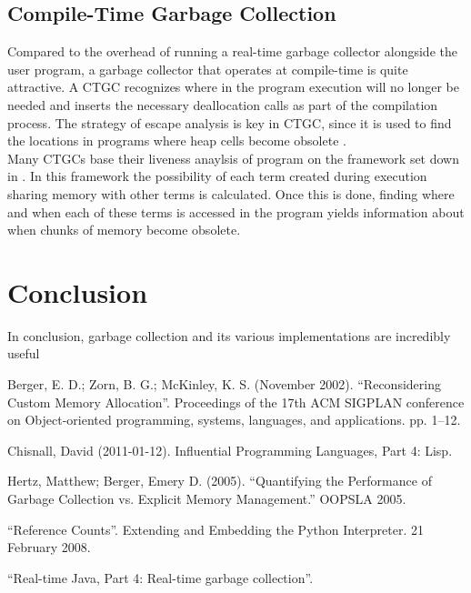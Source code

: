 \documentclass[12pt]{article}
\begin{document}
\subsection{Compile-Time Garbage Collection}
Compared to the overhead of running a real-time garbage collector alongside the user program, a garbage collector that operates at compile-time is quite attractive. A CTGC recognizes where in the program execution will no longer be needed and inserts the necessary deallocation calls as part of the compilation process. The strategy of escape analysis is key in CTGC, since it is used to find the locations in programs where heap cells become obsolete \cite{mercury}. \\

Many CTGCs base their liveness anaylsis of program on the framework set down in \cite{bruynooghe}. In this framework the possibility of each term created during execution sharing memory with other terms is calculated. Once this is done, finding where and when each of these terms is accessed in the program yields information about when chunks of memory become obsolete. 

\section{Conclusion}
In conclusion, garbage collection and its various implementations are incredibly useful 
\newpage
\begin{thebibliography}{}
  Berger, E. D.; Zorn, B. G.; McKinley, K. S. (November 2002). ``Reconsidering Custom Memory Allocation''. Proceedings of the 17th ACM SIGPLAN conference on Object-oriented programming, systems, languages, and applications. pp. 1–12.

  Chisnall, David (2011-01-12). Influential Programming Languages, Part 4: Lisp.
  
  Hertz, Matthew; Berger, Emery D. (2005). ``Quantifying the Performance of Garbage Collection vs. Explicit Memory Management.'' OOPSLA 2005.

  ``Reference Counts''. Extending and Embedding the Python Interpreter. 21 February 2008.

  ``Real-time Java, Part 4: Real-time garbage collection''.

\end{thebibliography}
\end{document}
